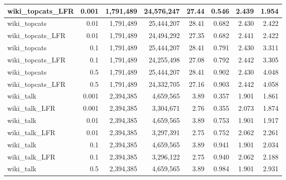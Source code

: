 \documentclass[a4paper]{article}   	%
\begin{document}
\begin{table}[h!]
\begin{tabular}{lrrrrrrr}
wiki\_topcats\_LFR & 0.001 & 1,791,489 & 24,576,247 & 27.44    & 0.546 & 2.439 & 1.954 \\ \hline
wiki\_topcats      & 0.01  & 1,791,489 & 25,444,207 & 28.41    & 0.682 & 2.430 & 2.422 \\
wiki\_topcats\_LFR & 0.01  & 1,791,489 & 24,494,292 & 27.35    & 0.682 & 2.441 & 2.422 \\ \hline
wiki\_topcats      & 0.1   & 1,791,489 & 25,444,207 & 28.41    & 0.791 & 2.430 & 3.311 \\
wiki\_topcats\_LFR & 0.1   & 1,791,489 & 24,255,498 & 27.08    & 0.792 & 2.442 & 3.305 \\ \hline
wiki\_topcats      & 0.5   & 1,791,489 & 25,444,207 & 28.41    & 0.902 & 2.430 & 4.048 \\
wiki\_topcats\_LFR & 0.5   & 1,791,489 & 24,332,705 & 27.16    & 0.903 & 2.442 & 4.058 \\ \hline \hline
wiki\_talk      & 0.001 & 2,394,385 & 4,659,565 & 3.89     & 0.357 & 1.901 & 1.861 \\
wiki\_talk\_LFR & 0.001 & 2,394,385 & 3,304,671 & 2.76     & 0.355 & 2.073 & 1.874 \\ \hline
wiki\_talk      & 0.01  & 2,394,385 & 4,659,565 & 3.89     & 0.753 & 1.901 & 1.917 \\
wiki\_talk\_LFR & 0.01  & 2,394,385 & 3,297,391 & 2.75     & 0.752 & 2.062 & 2.261 \\ \hline
wiki\_talk      & 0.1   & 2,394,385 & 4,659,565 & 3.89     & 0.941 & 1.901 & 2.034 \\
wiki\_talk\_LFR & 0.1   & 2,394,385 & 3,296,122 & 2.75     & 0.940 & 2.062 & 2.188 \\ \hline
wiki\_talk      & 0.5   & 2,394,385 & 4,659,565 & 3.89     & 0.984 & 1.901 & 2.931 \\ \hline
\end{tabular}
\label{table:all-params}
\end{table}

 \clearpage
\end{document}
